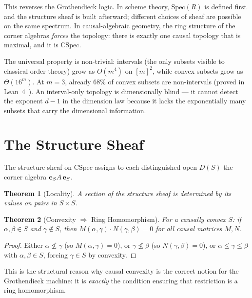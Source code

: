 \documentclass[11pt,a4paper]{article}
\theoremstyle{plain}
\newtheorem{theorem}{Theorem}[section]
\theoremstyle{definition}
\theoremstyle{remark}
\newcommand{\CSpec}{\mathrm{CSpec}}
\newcommand{\Spec}{\mathrm{Spec}}
\begin{document}
This reverses the Grothendieck logic.
In scheme theory, $\Spec(R)$ is defined first and the structure sheaf is built afterward; different choices of sheaf are possible on the same spectrum.
In causal-algebraic geometry, the ring structure of the corner algebras \emph{forces} the topology: there is exactly one causal topology that is maximal, and it is $\CSpec$.

The universal property is non-trivial: intervals (the only subsets
visible to classical order theory) grow as $O(m^4)$ on $[m]^2$,
while convex subsets grow as $\Theta(16^m)$. At $m = 3$, already
68\% of convex subsets are non-intervals (proved in
Lean~4~\cite{leanrepo}). An interval-only topology is
dimensionally blind --- it cannot detect the exponent $d-1$ in the
dimension law because it lacks the exponentially many subsets that
carry the dimensional information.


\section{The Structure Sheaf}\label{sec:sheaf}

The structure sheaf on $\CSpec$ assigns to each distinguished open $D(S)$ the corner algebra ${\bf e}_S A\, {\bf e}_S$.

\begin{theorem}[Locality]
A section of the structure sheaf is determined by its values on pairs in $S \times S$.
\end{theorem}

\begin{theorem}[Convexity $\Rightarrow$ Ring Homomorphism]\label{thm:convex:ring}
For a causally convex $S$: if $\alpha, \beta \in S$ and $\gamma \notin S$, then $M(\alpha, \gamma) \cdot N(\gamma, \beta) = 0$ for all causal matrices $M, N$.
\end{theorem}

\begin{proof}
Either $\alpha \not\leq \gamma$ (so $M(\alpha,\gamma) = 0$), or $\gamma \not\leq \beta$ (so $N(\gamma,\beta) = 0$), or $\alpha \leq \gamma \leq \beta$ with $\alpha, \beta \in S$, forcing $\gamma \in S$ by convexity.
\end{proof}

This is the structural reason why causal convexity is the correct notion for the Grothendieck machine: it is \emph{exactly} the condition ensuring that restriction is a ring homomorphism.
\end{document}
